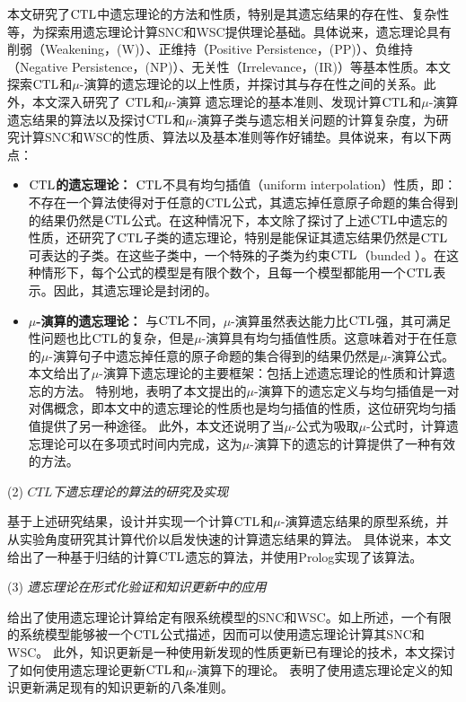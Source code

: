 本文研究了$\textrm{CTL}$中遗忘理论的方法和性质，特别是其遗忘结果的存在性、复杂性等，为探索用遗忘理论计算SNC和WSC提供理论基础。具体说来，遗忘理论具有削弱（Weakening，(W)）、正维持（Positive Persistence，(PP)）、负维持（Negative Persistence，(NP)）、无关性（Irrelevance，(IR)）等基本性质\cite{Yan:AIJ:2009}。本文探索$\textrm{CTL}$和$\mu$-演算的遗忘理论的以上性质，并探讨其与存在性之间的关系。此外，本文深入研究了 $\textrm{CTL}$和$\mu$-演算 遗忘理论的基本准则、发现计算$\textrm{CTL}$和$\mu$-演算遗忘结果的算法以及探讨$\textrm{CTL}$和$\mu$-演算子类与遗忘相关问题的计算复杂度，为研究计算SNC和WSC的性质、算法以及基本准则等作好铺垫。具体说来，有以下两点：
\begin{itemize}
	\item \textbf{$\textrm{CTL}$的遗忘理论：}
	$\textrm{CTL}$不具有均匀插值（uniform interpolation）性质\cite{Maksimova:JANCL:1991}，即：不存在一个算法使得对于任意的$\textrm{CTL}$公式，其遗忘掉任意原子命题的集合得到的结果仍然是$\textrm{CTL}$公式。在这种情况下，本文除了探讨了上述$\textrm{CTL}$中遗忘的性质，还研究了$\textrm{CTL}$子类的遗忘理论，特别是能保证其遗忘结果仍然是$\textrm{CTL}$可表达的子类。在这些子类中，一个特殊的子类为约束$\textrm{CTL}$（bunded \CTL）。在这种情形下，每个公式的模型是有限个数个，且每一个模型都能用一个$\textrm{CTL}$表示。因此，其遗忘理论是封闭的。
	
	\item \textbf{$\mu$-演算的遗忘理论：}
	与$\textrm{CTL}$不同，$\mu$-演算虽然表达能力比$\textrm{CTL}$强，其可满足性问题也比$\textrm{CTL}$的复杂，但是$\mu$-演算具有均匀插值性质\cite{DBLP:DAgostino:JAL:2006}。这意味着对于在任意的$\mu$-演算句子中遗忘掉任意的原子命题的集合得到的结果仍然是$\mu$-演算公式。本文给出了$\mu$-演算下遗忘理论的主要框架：包括上述遗忘理论的性质和计算遗忘的方法。
	特别地，表明了本文提出的$\mu$-演算下的遗忘定义与均匀插值是一对对偶概念，即本文中的遗忘理论的性质也是均匀插值的性质，这位研究均匀插值提供了另一种途径。
	此外，本文还说明了当$\mu$-公式为吸取$\mu$-公式时，计算遗忘理论可以在多项式时间内完成，这为$\mu$-演算下的遗忘的计算提供了一种有效的方法。
\end{itemize}


(2) {\em $CTL$下遗忘理论的算法的研究及实现}

基于上述研究结果，设计并实现一个计算$\textrm{CTL}$和$\mu$-演算遗忘结果的原型系统，并从实验角度研究其计算代价以启发快速的计算遗忘结果的算法。
具体说来，本文给出了一种基于归结的计算$\textrm{CTL}$遗忘的算法，并使用Prolog实现了该算法。

(3) {\em 遗忘理论在形式化验证和知识更新中的应用}

给出了使用遗忘理论计算给定有限系统模型的SNC和WSC。如上所述，一个有限的系统模型能够被一个$\textrm{CTL}$公式描述，因而可以使用遗忘理论计算其SNC和WSC。
此外，知识更新是一种使用新发现的性质更新已有理论的技术，本文探讨了如何使用遗忘理论更新$\textrm{CTL}$和$\mu$-演算下的理论。
表明了使用遗忘理论定义的知识更新满足现有的知识更新的八条准则。

